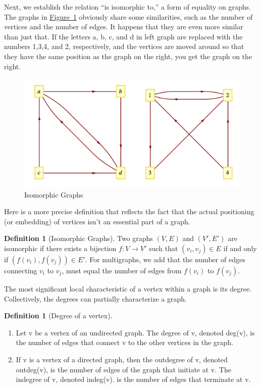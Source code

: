 \documentclass[10pt,]{book}
\theoremstyle{plain}
\theoremstyle{definition}
\newtheorem{definition}[theorem]{Definition}
\theoremstyle{definition}
\theoremstyle{definition}
\theoremstyle{definition}
\theoremstyle{definition}
\numberwithin{equation}{section}
\begin{document}
\par
Next, we establish the relation ``is isomorphic to,'' a form of equality on graphs. The graphs in \hyperref[fig-isomorphic-graphs-9-1]{Figure~\ref{fig-isomorphic-graphs-9-1}} obviously share some similarities, such as the number of vertices and the number of edges. It happens that they are even more similar than just that. If the letters a, b, c, and d in left graph are replaced with the numbers 1,3,4, and 2, respectively, and the vertices are moved around so that they have the same position as the graph on the right, you get the graph on the right.%
\leavevmode%
\begin{figure}
\centering
\includegraphics[width=1\linewidth]{images/fig-isomorphic-graphs-9-1.png}
\caption{Isomorphic Graphs
                \label{fig-isomorphic-graphs-9-1}}
\end{figure}
\par
Here is a more precise definition that reflects the fact that the actual positioning (or embedding) of vertices isn't an essential part of a graph.%
\begin{definition}[Isomorphic Graphs]\label{def-isomorphic-graphs.}
Two graphs \((V, E)\) and \((V', E')\) are isomorphic if there exists a bijection \(f:V\to V'\) such that \(\left(v_i,v_j\right)\in
E\) if and only if \(\left(f\left(v_i\right),f\left(v_j\right)\right)\in E'\). For multigraphs, we add that the number of edges connecting \(v_i\)
to \(v_j\), must equal the number of edges from \(f\left(v_i\right)\) to \(f\left(v_j\right)\).%
\end{definition}
\par
The most significant local characteristic of a vertex within a graph is its degree.
 Collectively, the degrees can partially characterize a graph.%
\begin{definition}[Degree of a vertex]\label{def-degree-of-a-vertex}
\label{notation-3}
\leavevmode%
\begin{enumerate}[label=\alph*]
\item\hypertarget{li-4}{} Let v be a vertex of an undirected graph. The degree of v, denoted \textup{ deg}(v), is the number of edges that connect v to the other vertices in the graph.%
\item\hypertarget{li-5}{} If v is a vertex of a directed graph, then the outdegree of v, denoted \textup{ outdeg}(v), is the number of edges of the graph that initiate
at v. The indegree of v, denoted \textup{ indeg}(v). is the number of edges that terminate at v.%
\end{enumerate}
%
\end{definition}
\end{document}
